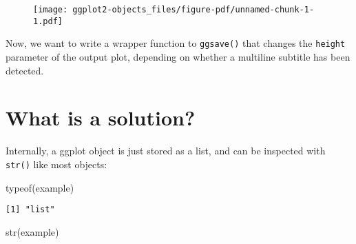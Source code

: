 \documentclass[
  letterpaper,
  DIV=11,
  numbers=noendperiod]{scrreprt}
\newenvironment{Shaded}{\begin{snugshade}}{\end{snugshade}}
\newcommand{\FunctionTok}[1]{\textcolor[rgb]{0.28,0.35,0.67}{#1}}
\newcommand{\NormalTok}[1]{\textcolor[rgb]{0.00,0.23,0.31}{#1}}
\begin{document}
\begin{figure}[H]

{\centering \texttt{[image: ggplot2-objects\_files/figure-pdf/unnamed-chunk-1-1.pdf]}

}

\end{figure}

Now, we want to write a wrapper function to \texttt{ggsave()} that
changes the \texttt{height} parameter of the output plot, depending on
whether a multiline subtitle has been detected.

\hypertarget{what-is-a-solution-1}{%
\section{What is a solution?}\label{what-is-a-solution-1}}

Internally, a ggplot object is just stored as a list, and can be
inspected with \texttt{str()} like most objects:

\begin{Shaded}
\begin{Highlighting}[]
\FunctionTok{typeof}\NormalTok{(example)}
\end{Highlighting}
\end{Shaded}

\begin{verbatim}
[1] "list"
\end{verbatim}

\begin{Shaded}
\begin{Highlighting}[]
\FunctionTok{str}\NormalTok{(example)}
\end{Highlighting}
\end{Shaded}
\end{document}
